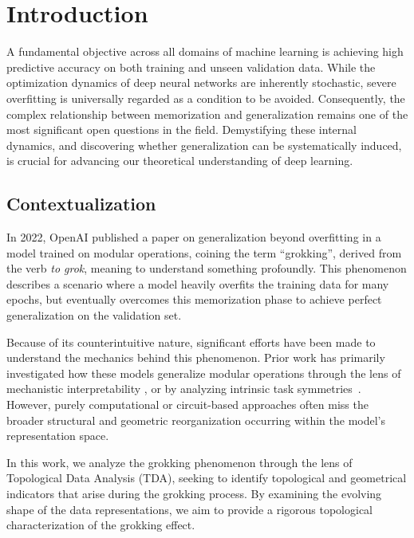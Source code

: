 \section{Introduction}

A fundamental objective across all domains of machine learning is achieving high predictive accuracy on both training and unseen validation data. While the optimization dynamics of deep neural networks are inherently stochastic, severe overfitting is universally regarded as a condition to be avoided. Consequently, the complex relationship between memorization and generalization remains one of the most significant open questions in the field. Demystifying these internal dynamics, and discovering whether generalization can be systematically induced, is crucial for advancing our theoretical understanding of deep learning.

\subsection{Contextualization}

In 2022, OpenAI published a paper on generalization beyond overfitting \cite{GrokkingOpenAI} in a model trained on modular operations, coining the term ``grokking'', derived from the verb \textit{to grok}, meaning to understand something profoundly. This phenomenon describes a scenario where a model heavily overfits the training data for many epochs, but eventually overcomes this memorization phase to achieve perfect generalization on the validation set.

Because of its counterintuitive nature, significant efforts have been made to understand the mechanics behind this phenomenon. Prior work has primarily investigated how these models generalize modular operations through the lens of mechanistic interpretability \cite{nanda2023progressmeasuresgrokkingmechanistic}, or by analyzing intrinsic task symmetries~\cite{hwang2026intrinsic}. However, purely computational or circuit-based approaches often miss the broader structural and geometric reorganization occurring within the model's representation space.

In this work, we analyze the grokking phenomenon through the lens of Topological Data Analysis (TDA), seeking to identify topological and geometrical indicators that arise during the grokking process. By examining the evolving shape of the data representations, we aim to provide a rigorous topological characterization of the grokking effect.

